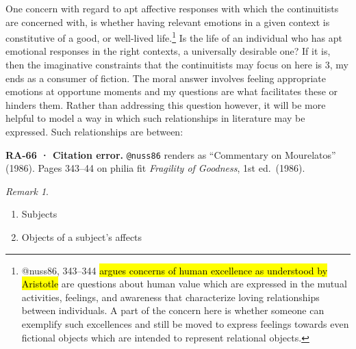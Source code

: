 \documentclass[
  letterpaper,
  DIV=11,
  numbers=noendperiod]{scrartcl}
\providecommand{\tightlist}{%
  \setlength{\itemsep}{0pt}\setlength{\parskip}{0pt}}
\theoremstyle{remark}
\newtheorem*{remark}{Remark}
\begin{document}
One concern with regard to apt affective responses with which the
continuitists are concerned with, is whether having relevant emotions in
a given context is constitutive of a good, or well-lived
life.\footnote{@nuss86, 343--344 \hl{argues concerns of human excellence
  as understood by Aristotle} are questions about human value which are
  expressed in the mutual activities, feelings, and awareness that
  characterize loving relationships between individuals. A part of the
  concern here is whether someone can exemplify such excellences and
  still be moved to express feelings towards even fictional objects
  which are intended to represent relational objects.} Is the life of an
individual who has apt emotional responses in the right contexts, a
universally desirable one? If it is, then the imaginative constraints
that the continuitists may focus on here is 3, my ends as a consumer of
fiction. The moral answer involves feeling appropriate emotions at
opportune moments and my questions are what facilitates these or hinders
them. Rather than addressing this question however, it will be more
helpful to model a way in which such relationships in literature may be
expressed. Such relationships are between:

\begin{tcolorbox}[enhanced jigsaw, arc=.35mm, bottomrule=.15mm, bottomtitle=1mm, breakable, colback=white, colbacktitle=quarto-callout-warning-color!10!white, colframe=quarto-callout-warning-color-frame, coltitle=black, left=2mm, leftrule=.75mm, opacityback=0, opacitybacktitle=0.6, rightrule=.15mm, title=\textcolor{quarto-callout-warning-color}{\faExclamationTriangle}\hspace{0.5em}{Warning}, titlerule=0mm, toprule=.15mm, toptitle=1mm]

\textbf{RA-66 · Citation error.} \texttt{@nuss86} renders as
``Commentary on Mourelatos'' (1986). Pages 343--44 on philia fit
\emph{Fragility of Goodness}, 1st ed.~(1986).

\end{tcolorbox}

\begin{remark}
\leavevmode

\begin{enumerate}
\def\labelenumi{\arabic{enumi}.}
\tightlist
\item
  Subjects
\item
  Objects of a subject's affects
\end{enumerate}

\end{remark}
\end{document}
